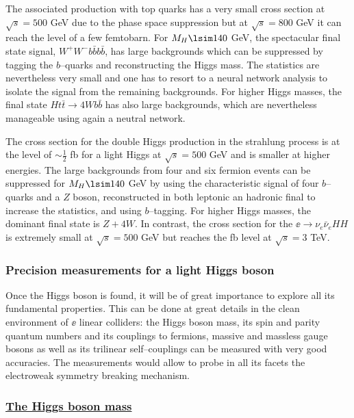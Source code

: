 {The associated production with top quarks has a very small cross
section at $\sqrt{s}=500$ GeV due to the phase space suppression but at
$\sqrt{s}=800$ GeV it can reach the level of a few femtobarn.  For $M_H \lsim
140$ GeV, the spectacular final state signal, $W^+W^- b\bar{b} b \bar{b}$, has
large backgrounds which can be suppressed by tagging the $b$--quarks and 
reconstructing the Higgs mass. The statistics are nevertheless very small 
and one has to resort to a neural network analysis to isolate the signal from
the remaining backgrounds. For higher Higgs masses, the final state 
$H t \bar t \to 4W b\bar b$ has also large backgrounds, which are nevertheless
manageable using again a neutral network. \s

The cross section for the double Higgs production in the strahlung process is
at the level of $\sim \frac12$ fb for a light Higgs at $\sqrt{s} =500$ GeV and 
is smaller at higher energies. The large backgrounds from four and six fermion
events can be suppressed for $M_H \lsim 140$ GeV by using the characteristic
signal of four $b$--quarks and a $Z$ boson, reconstructed in both leptonic an
hadronic final to increase the statistics, and using $b$--tagging. For higher
Higgs masses, the dominant final state is $Z+4W$.  In contrast, the cross
section for the $\ee \to \nu_e \bar{\nu}_e HH$ is extremely small at $\sqrt{s}
=500$ GeV but reaches the fb level at $\sqrt{s} =3$ TeV.  

\subsubsection{Precision measurements for a light Higgs boson}

Once the Higgs boson is found, it will be of great importance to explore all
its fundamental properties. This can be done at great details in the clean
environment of $\ee$ linear colliders: the Higgs boson mass, its spin  and
parity quantum numbers and its couplings to fermions, massive and massless
gauge bosons as well as its trilinear self--couplings can be measured with very
good accuracies. The measurements would allow to probe in all its facets  
the electroweak symmetry breaking mechanism. 

\vspace*{-2mm}
\subsubsection*{\underline{The Higgs boson mass}}
\vspace*{-1mm}

}
